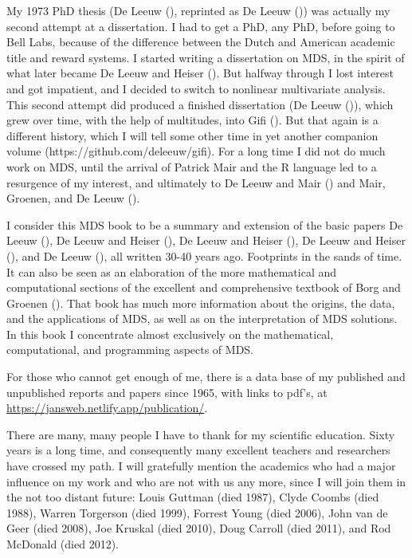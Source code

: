 \documentclass[
  12pt,
  letterpaper,
  DIV=11,
  numbers=noendperiod]{scrreprt}
\theoremstyle{remark}
\begin{document}
My 1973 PhD thesis (De Leeuw (),
reprinted as De Leeuw ()) was actually
my second attempt at a dissertation. I had to get a PhD, any PhD, before
going to Bell Labs, because of the difference between the Dutch and
American academic title and reward systems. I started writing a
dissertation on MDS, in the spirit of what later became De Leeuw and
Heiser (). But halfway through I
lost interest and got impatient, and I decided to switch to nonlinear
multivariate analysis. This second attempt did produced a finished
dissertation (De Leeuw ()), which grew
over time, with the help of multitudes, into Gifi
(). But that again is a different history,
which I will tell some other time in yet another companion volume
(https://github.com/deleeuw/gifi). For a long time I did not do much
work on MDS, until the arrival of Patrick Mair and the R language led to
a resurgence of my interest, and ultimately to De Leeuw and Mair
() and Mair, Groenen, and De
Leeuw ().

I consider this MDS book to be a summary and extension of the basic
papers De Leeuw (), De Leeuw and
Heiser (), De Leeuw and Heiser
(), De Leeuw and Heiser
(), and De Leeuw
(), all written 30-40 years ago.
Footprints in the sands of time. It can also be seen as an elaboration
of the more mathematical and computational sections of the excellent and
comprehensive textbook of Borg and Groenen
(). That book has much more
information about the origins, the data, and the applications of MDS, as
well as on the interpretation of MDS solutions. In this book I
concentrate almost exclusively on the mathematical, computational, and
programming aspects of MDS.

For those who cannot get enough of me, there is a data base of my
published and unpublished reports and papers since 1965, with links to
pdf's, at \url{https://jansweb.netlify.app/publication/}.

There are many, many people I have to thank for my scientific education.
Sixty years is a long time, and consequently many excellent teachers and
researchers have crossed my path. I will gratefully mention the
academics who had a major influence on my work and who are not with us
any more, since I will join them in the not too distant future: Louis
Guttman (died 1987), Clyde Coombs (died 1988), Warren Torgerson (died
1999), Forrest Young (died 2006), John van de Geer (died 2008), Joe
Kruskal (died 2010), Doug Carroll (died 2011), and Rod McDonald (died
2012).
\end{document}
